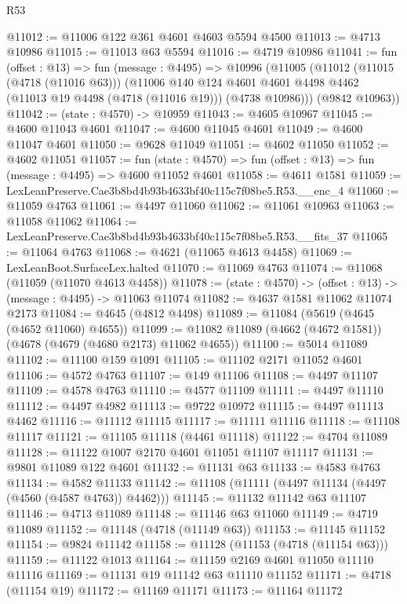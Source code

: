 \begin{lexlean}{R53}
\begin{coremodule}
@11012 := @11006 @122 @361 @4601 @4603 @5594 @4500
@11013 := @4713 @10986
@11015 := @11013 @63 @5594
@11016 := @4719 @10986
@11041 := fun (offset : @13) =>
  fun (message : @4495) =>
  @10996
    (@11005
      (@11012
        (@11015 (@4718 (@11016 @63)))
        (@11006
          @140
          @124
          @4601
          @4601
          @4498
          @4462
          (@11013 @19 @4498 (@4718 (@11016 @19)))
          (@4738 @10986)))
      (@9842 @10963))
@11042 := (state : @4570) -> @10959
@11043 := @4605 @10967
@11045 := @4600 @11043 @4601
@11047 := @4600 @11045 @4601
@11049 := @4600 @11047 @4601
@11050 := @9628 @11049
@11051 := @4602 @11050
@11052 := @4602 @11051
@11057 := fun (state : @4570) => fun (offset : @13) => fun (message : @4495) => @4600 @11052 @4601
@11058 := @4611 @1581
@11059 := LexLeanPreserve.Cae3b8bd4b93b4633bf40c115c7f08be5.R53.__enc_4
@11060 := @11059 @4763
@11061 := @4497 @11060
@11062 := @11061 @10963
@11063 := @11058 @11062
@11064 := LexLeanPreserve.Cae3b8bd4b93b4633bf40c115c7f08be5.R53.__fits_37
@11065 := @11064 @4763
@11068 := @4621 (@11065 @4613 @4458)
@11069 := LexLeanBoot.SurfaceLex.halted
@11070 := @11069 @4763
@11074 := @11068 (@11059 (@11070 @4613 @4458))
@11078 := (state : @4570) -> (offset : @13) -> (message : @4495) -> @11063 @11074
@11082 := @4637 @1581 @11062 @11074 @2173
@11084 := @4645 (@4812 @4498)
@11089 := @11084 (@5619 (@4645 (@4652 @11060) @4655))
@11099 := @11082 @11089 (@4662 (@4672 @1581)) (@4678 (@4679 (@4680 @2173) @11062 @4655))
@11100 := @5014 @11089
@11102 := @11100 @159 @1091
@11105 := @11102 @2171 @11052 @4601
@11106 := @4572 @4763
@11107 := @149 @11106
@11108 := @4497 @11107
@11109 := @4578 @4763
@11110 := @4577 @11109
@11111 := @4497 @11110
@11112 := @4497 @4982
@11113 := @9722 @10972
@11115 := @4497 @11113 @4462
@11116 := @11112 @11115
@11117 := @11111 @11116
@11118 := @11108 @11117
@11121 := @11105 @11118 (@4461 @11118)
@11122 := @4704 @11089
@11128 := @11122 @1007 @2170 @4601 @11051 @11107 @11117
@11131 := @9801 @11089 @122 @4601
@11132 := @11131 @63
@11133 := @4583 @4763
@11134 := @4582 @11133
@11142 := @11108 (@11111 (@4497 @11134 (@4497 (@4560 (@4587 @4763)) @4462)))
@11145 := @11132 @11142 @63 @11107
@11146 := @4713 @11089
@11148 := @11146 @63 @11060
@11149 := @4719 @11089
@11152 := @11148 (@4718 (@11149 @63))
@11153 := @11145 @11152
@11154 := @9824 @11142
@11158 := @11128 (@11153 (@4718 (@11154 @63)))
@11159 := @11122 @1013
@11164 := @11159 @2169 @4601 @11050 @11110 @11116
@11169 := @11131 @19 @11142 @63 @11110 @11152
@11171 := @4718 (@11154 @19)
@11172 := @11169 @11171
@11173 := @11164 @11172

\end{coremodule}
\end{lexlean}
